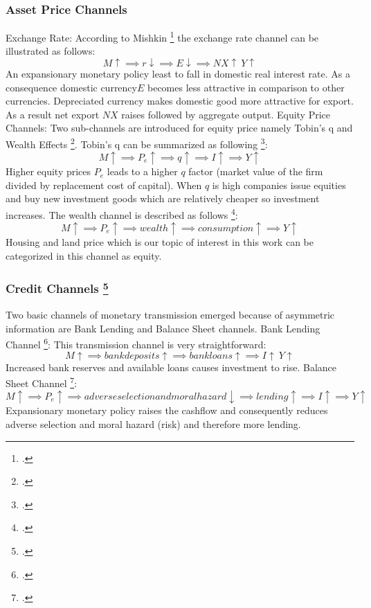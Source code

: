 \subsubsection{Asset Price Channels}
Exchange Rate:
According to Mishkin \footcite[See.][]{Mishkin1996} the exchange rate channel can be illustrated as follows:
 \[M \uparrow \implies r \downarrow \implies E \downarrow \implies NX \uparrow\ Y \uparrow\]
An expansionary monetary policy least to fall in domestic real interest rate. As a consequence domestic currency$E$  becomes less attractive in comparison to other currencies. Depreciated currency makes domestic good more attractive for export. As a result net export $NX$ raises followed by aggregate output. 
Equity Price Channels:
 Two sub-channels are introduced for equity price namely Tobin's q and Wealth Effects \footcite[See.][]{Mishkin1996}. 
Tobin's q can be summarized as following \footcite[See.][]{Mishkin1996}: 
 \[M \uparrow \implies P_e \uparrow \implies q \uparrow \implies I \uparrow \implies Y \uparrow\]
Higher equity prices $P_e$ leads to a higher $q$ factor (market value of the firm divided by replacement cost of capital). When $q$ is high companies issue equities and buy new investment goods which are relatively cheaper so investment increases. 
The wealth channel is described as follows \footcite[See.][]{Mishkin1996}: 
\[M \uparrow \implies P_e \uparrow \implies wealth \uparrow \implies consumption \uparrow \implies Y \uparrow\]
Housing and land price which is our topic of interest in this work can be categorized in this channel as equity.

\subsubsection{Credit Channels \footcite[See.][]{Mishkin1996}}
Two basic channels of monetary transmission emerged because of asymmetric information are Bank Lending and Balance Sheet channels. 
Bank Lending Channel \footcite[See.][]{Mishkin1996}:
This transmission channel is very straightforward:
 \[M \uparrow \implies bank deposits \uparrow \implies bank loans \uparrow \implies I \uparrow\ Y \uparrow\]
Increased bank reserves and available loans causes investment to rise.
Balance Sheet Channel \footcite[See.][]{Mishkin1996}:
 \[M \uparrow \implies P_e \uparrow \implies adverse selection and moral hazard \downarrow \implies lending \uparrow \implies I \uparrow \implies Y \uparrow\]
Expansionary monetary policy raises the cashflow and consequently reduces adverse selection and moral hazard (risk) and therefore more lending.

